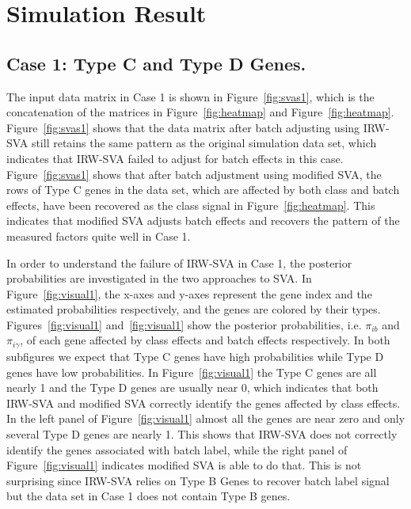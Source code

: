 \documentclass[11pt]{article}
\begin{document}
\newpage
\section{Simulation Result}

\subsection{Case 1: Type C and Type D Genes.}

The input data matrix in Case 1 is shown in Figure~\ref{fig:svas1}, which is the concatenation of the matrices in Figure~\ref{fig:heatmap} and Figure~\ref{fig:heatmap}. Figure~\ref{fig:svas1} shows that the data matrix after batch adjusting using IRW-SVA still retains the same pattern as the original simulation data set, which indicates that IRW-SVA failed to adjust for batch effects in this case. Figure~\ref{fig:svas1} shows that after batch adjustment using modified SVA, the rows of Type C genes in the data set, which are affected by both class and batch effects, have been recovered as the class signal in Figure~\ref{fig:heatmap}. This indicates that modified SVA adjusts batch effects and recovers the pattern of the measured factors quite well in Case 1. 

In order to understand the failure of IRW-SVA in Case 1, the posterior probabilities are investigated in the two approaches to SVA. In Figure~\ref{fig:visual1}, the x-axes and y-axes represent the gene index and the estimated probabilities respectively, and the genes are colored by their types. Figures~\ref{fig:visual1} and~\ref{fig:visual1} show the posterior probabilities, i.e. $\pi_{i b}$ and $\pi_{i \gamma}$, of each gene affected by class effects and batch effects respectively. In both subfigures we expect that Type C genes have high probabilities while Type D genes have low probabilities. In Figure~\ref{fig:visual1} the Type C genes are all nearly 1 and the Type D genes are usually near 0, which indicates that both IRW-SVA and modified SVA correctly identify the genes affected by class effects. In the left panel of Figure~\ref{fig:visual1} almost all the genes are near zero and only several Type D genes are nearly 1. This shows that IRW-SVA does not correctly identify the genes associated with batch label, while the right panel of Figure~\ref{fig:visual1} indicates modified SVA is able to do that. This is not surprising since IRW-SVA relies on Type B Genes to recover batch label signal but the data set in Case 1 does not contain Type B genes.
\end{document}
